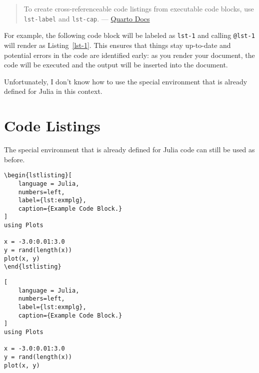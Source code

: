 \documentclass{juliacon}
\begin{document}
\begin{quote}
To create cross-referenceable code listings from executable code blocks,
use \texttt{lst-label} and \texttt{lst-cap}. ---
\href{https://quarto.org/docs/prerelease/1.4/crossref.html\#cross-referenceable-listings-of-executable-code-blocks}{Quarto
Docs}
\end{quote}

For example, the following code block will be labeled as \texttt{lst-1}
and calling \texttt{@lst-1} will render as Listing~\ref{lst-1}. This
ensures that things stay up-to-date and potential errors in the code are
identified early: as you render your document, the code will be executed
and the output will be inserted into the document.

\begin{codelisting}

\caption{\label{lst-1}A listing caption}


\end{codelisting}%

Unfortunately, I don't know how to use the special environment that is
already defined for Julia in this context.

\section{Code Listings}\label{code-listings}

The special environment that is already defined for Julia code can still
be used as before.

\begin{verbatim}
\begin{lstlisting}[
    language = Julia, 
    numbers=left, 
    label={lst:exmplg}, 
    caption={Example Code Block.}
]
using Plots

x = -3.0:0.01:3.0
y = rand(length(x))
plot(x, y)
\end{lstlisting}
\end{verbatim}
\begin{lstlisting}[
    language = Julia, 
    numbers=left, 
    label={lst:exmplg}, 
    caption={Example Code Block.}
]
using Plots

x = -3.0:0.01:3.0
y = rand(length(x))
plot(x, y)
\end{lstlisting}
\end{document}
